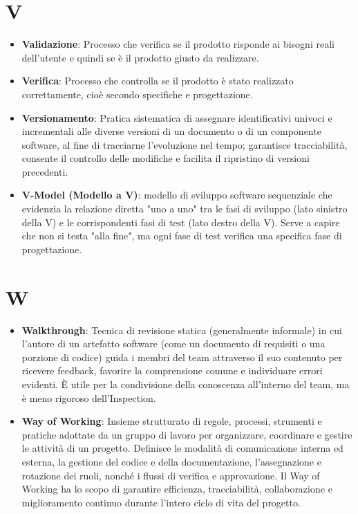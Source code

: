 \documentclass[11pt,a4paper]{article}
\begin{document}
\section*{V}
\begin{itemize}
\item \textbf{Validazione}: Processo che verifica se il prodotto risponde ai bisogni reali dell’utente e quindi se è il prodotto giusto da realizzare.

\item \textbf{Verifica}: Processo che controlla se il prodotto è stato realizzato correttamente, cioè secondo specifiche e progettazione.

\item \textbf{Versionamento}: Pratica sistematica di assegnare identificativi univoci e incrementali alle diverse versioni di un documento o di un componente software, al fine di tracciarne l'evoluzione nel tempo; garantisce tracciabilità, consente il controllo delle modifiche e facilita il ripristino di versioni precedenti.

\item \textbf{V-Model (Modello a V)}: modello di sviluppo software sequenziale che evidenzia la relazione diretta "uno a uno" tra le fasi di sviluppo (lato sinistro della V) e le corrispondenti fasi di test (lato destro della V). Serve a capire che non si testa "alla fine", ma ogni fase di test verifica una specifica fase di progettazione.


\end{itemize}

\newpage

\section*{W}
\begin{itemize}
\item \textbf{Walkthrough}: Tecnica di revisione statica (generalmente informale) in cui l'autore di un artefatto software (come un documento di requisiti o una porzione di codice) guida i membri del team attraverso il suo contenuto per ricevere feedback, favorire la comprensione comune e individuare errori evidenti. È utile per la condivisione della conoscenza all'interno del team, ma è meno rigoroso dell'Inspection.

\item \textbf{Way of Working}: Insieme strutturato di regole, processi, strumenti e pratiche adottate da un gruppo di lavoro per organizzare, coordinare e gestire le attività di un progetto. Definisce le modalità di comunicazione interna ed esterna, la gestione del codice e della documentazione, l’assegnazione e rotazione dei ruoli, nonché i flussi di verifica e approvazione. Il Way of Working ha lo scopo di garantire efficienza, tracciabilità, collaborazione e miglioramento continuo durante l’intero ciclo di vita del progetto.

\end{itemize}
\end{document}
